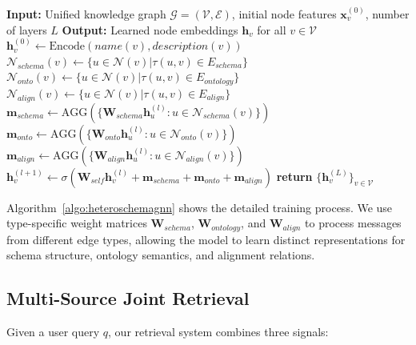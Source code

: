 \documentclass[sigconf, nonatbib]{acmart}
\begin{document}
\begin{algorithm}[t]
    \caption{HeteroSchemaGNN Training Process}
    \label{algo:heteroschemagnn}
    \begin{algorithmic}
    \STATE \textbf{Input:} Unified knowledge graph $\mathcal{G} = (\mathcal{V}, \mathcal{E})$, initial node features $\mathbf{x}_v^{(0)}$, number of layers $L$
    \STATE \textbf{Output:} Learned node embeddings $\mathbf{h}_v$ for all $v \in \mathcal{V}$
    \STATE
        \STATE $\mathbf{h}_v^{(0)} \leftarrow \text{Encode}(name(v), description(v))$ 
    \ENDFOR
    \STATE
            \STATE $\mathcal{N}_{schema}(v) \leftarrow \{u \in \mathcal{N}(v) | \tau(u,v) \in E_{schema}\}$
            \STATE $\mathcal{N}_{onto}(v) \leftarrow \{u \in \mathcal{N}(v) | \tau(u,v) \in E_{ontology}\}$
            \STATE $\mathcal{N}_{align}(v) \leftarrow \{u \in \mathcal{N}(v) | \tau(u,v) \in E_{align}\}$
            \STATE
            \STATE $\mathbf{m}_{schema} \leftarrow \text{AGG}\left(\{\mathbf{W}_{schema} \mathbf{h}_u^{(l)} : u \in \mathcal{N}_{schema}(v)\}\right)$
            \STATE $\mathbf{m}_{onto} \leftarrow \text{AGG}\left(\{\mathbf{W}_{onto} \mathbf{h}_u^{(l)} : u \in \mathcal{N}_{onto}(v)\}\right)$
            \STATE $\mathbf{m}_{align} \leftarrow \text{AGG}\left(\{\mathbf{W}_{align} \mathbf{h}_u^{(l)} : u \in \mathcal{N}_{align}(v)\}\right)$
            \STATE
            \STATE $\mathbf{h}_v^{(l+1)} \leftarrow \sigma(\mathbf{W}_{self}\mathbf{h}_v^{(l)} + \mathbf{m}_{schema} + \mathbf{m}_{onto} + \mathbf{m}_{align})$
        \ENDFOR
    \ENDFOR
    \STATE
    \STATE \textbf{return} $\{\mathbf{h}_v^{(L)}\}_{v \in \mathcal{V}}$
    \end{algorithmic}
\end{algorithm}

Algorithm~\ref{algo:heteroschemagnn} shows the detailed training process. We use type-specific weight matrices $\mathbf{W}_{schema}$, $\mathbf{W}_{ontology}$, and $\mathbf{W}_{align}$ to process messages from different edge types, allowing the model to learn distinct representations for schema structure, ontology semantics, and alignment relations.

\subsection{Multi-Source Joint Retrieval}

Given a user query $q$, our retrieval system combines three signals:
\end{document}
